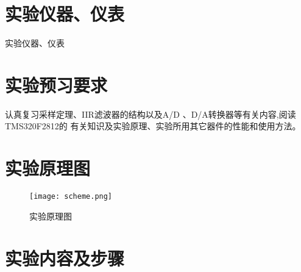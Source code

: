 \documentclass[../main]{subfiles}
\begin{document}
\section{实验仪器、仪表}%
\label{sec:\arabic{chapter}实验仪器、仪表}

\begin{table}[htbp]
	\centering
	\caption{实验仪器、仪表}
	\label{tab:实验仪器、仪表}
\end{table}

\section{实验预习要求}%
\label{sec:\arabic{chapter}实验预习要求}

认真复习采样定理、IIR滤波器的结构以及A/D 、D/A转换器等有关内容,阅读TMS320F2812的
有关知识及实验原理、实验所用其它器件的性能和使用方法。

\section{实验原理图}%
\label{sec:\arabic{chapter}实验原理图}

\begin{figure}[htbp]
	\centering
	\texttt{[image: scheme.png]}
	\caption{实验原理图}
	\label{fig:实验原理图}
\end{figure}

\section{实验内容及步骤}%
\label{sec:\arabic{chapter}实验内容及步骤}
\end{document}
